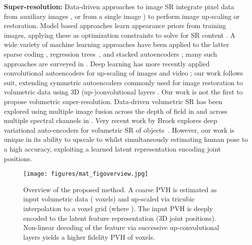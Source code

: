 \documentclass[runningheads]{llncs}
\begin{document}
{\bf Super-resolution:} Data-driven approaches to image SR integrate pixel data \eg from auxiliary images \cite{Fattal2007}, or from a single image \cite{Glasner2009,Zhu2014}) to perform image up-scaling or restoration.  Model based approaches learn appearance priors from training images, applying these as optimization constraints to solve for SR content \cite{Freeman2002}. A wide variety of machine learning approaches have been applied to the latter \eg sparse coding \cite{Atalay2017}, regression trees~\cite{Schmidt2016}, and stacked autoencoders \cite{Vincent2008}; many such approaches are surveyed in \cite{srsurvey}.  Deep learning has more recently applied convolutional autoencoders for up-scaling of images \cite{Xie2012,Wang2015,Dong2016} and video \cite{Shi2016}; our work follows suit, extending symmetric autoencoders commonly used for image restoration to volumetric data using 3D (up-)convolutional layers \cite{Jain2008}.  Our work is not the first to propose volumetric super-resolution. Data-driven volumetric SR has been explored using multiple image fusion across the depth of field in \cite{Abrahamsson2017} and across multiple spectral channels in \cite{Atalay2017}.  Very recent work by Brock \etal explores deep variational auto-encoders for volumetric SR of objects~\cite{brock_generative_2016}. However, our work is unique in its ability to upscale to  whilst simultaneously estimating human pose to a high accuracy, exploiting a learned latent representation encoding joint positions.


\begin{figure}[t!]
\centering
\texttt{[image: figures/mat\_figoverview.jpg]}
\caption{Overview of the proposed method.  A coarse PVH is estimated as input volumetric data ( voxels) and up-scaled via tricubic interpolation to a  voxel grid (where ). The input PVH is deeply encoded to the latent feature representation (3D joint positions). Non-linear decoding of the feature via successive up-convolutional layers yields a higher fidelity PVH of  voxels. }
\label{fig:overview}
\squeezeup
\end{figure}
\end{document}
